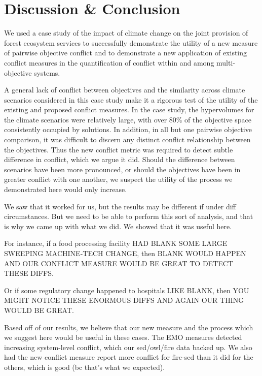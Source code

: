 \section{Discussion \& Conclusion}
We used a case study of the impact of climate change on the joint provision of forest ecosystem services to successfully demonstrate the utility of a new measure of pairwise objective conflict and to demonstrate a new application of existing conflict measures in the quantification of conflict within and among multi-objective systems.

A general lack of conflict between objectives and the similarity across climate scenarios considered in this case study make it a rigorous test of the utility of the existing and proposed conflict measures. In the case study, the hypervolumes for the climate scenarios were relatively large, with over 80\% of the objective space consistently occupied by solutions. In addition, in all but one pairwise objective comparison, it was difficult to discern any distinct conflict relationship between the objectives. Thus the new conflict metric was required to detect subtle difference in conflict, which we argue it did. Should the difference between scenarios have been more pronounced, or should the objectives have been in greater conflict with one another, we suspect the utility of the process we demonstrated here would only increase.

We saw that it worked for us, but the results may be different if under diff circumstances. But we need to be able to perform this sort of analysis, and that is why we came up with what we did. We showed that it was useful here.

For instance, if a food processing facility HAD BLANK SOME LARGE SWEEPING MACHINE-TECH CHANGE, then BLANK WOULD HAPPEN AND OUR CONFLICT MEASURE WOULD BE GREAT TO DETECT THESE DIFFS.

Or if some regulatory change happened to hospitals LIKE BLANK, then YOU MIGHT NOTICE THESE ENORMOUS DIFFS AND AGAIN OUR THING WOULD BE GREAT.

Based off of our results, we believe that our new measure and the process which we suggest here would be useful in these cases. The EMO measures detected increasing system-level conflict, which our sed/owl/fire data backed up. We also had the new conflict measure report more conflict for fire-sed than it did for the others, which is good (bc that's what we expected).

